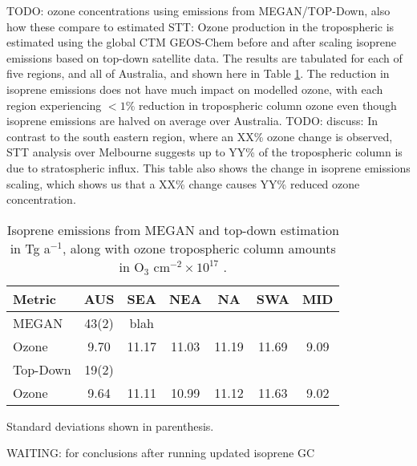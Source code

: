   TODO: ozone concentrations using emissions from MEGAN/TOP-Down, also how these compare to estimated STT:
  Ozone production in the tropospheric is estimated using the global CTM GEOS-Chem before and after scaling isoprene emissions based on top-down satellite data. 
  The results are tabulated for each of five regions, and all of Australia, and shown here in Table \ref{Conclusions:ozone:tab_emissions_vs_ozone}.
  The reduction in isoprene emissions does not have much impact on modelled ozone, with each region experiencing $< 1\%$ reduction in tropospheric column ozone even though isoprene emissions are halved on average over Australia.
  TODO: discuss: In contrast to the south eastern region, where an XX\% ozone change is observed, STT analysis over Melbourne suggests up to YY\% of the tropospheric column is due to stratospheric influx.
  This table also shows the change in isoprene emissions scaling, which shows us that a XX\% change causes YY\% reduced ozone concentration.
  

  \begin{table}\begin{threeparttable}
    \caption{Isoprene emissions from MEGAN and top-down estimation in Tg a$^{-1}$, along with ozone tropospheric column amounts in O$_3$ cm$^{-2} \times 10^{17}$ .}
    \begin{tabular}{ l c c c c c c } 
      \toprule
      Metric & AUS & SEA & NEA & NA & SWA & MID \\
      \midrule
      MEGAN & 43(2) & blah &  &  & & \\
      Ozone & 9.70 & 11.17 & 11.03 & 11.19 & 11.69 & 9.09 \\
      \midrule
      Top-Down & 19(2) & & & & & \\
      Ozone & 9.64 & 11.11 & 10.99 & 11.12 & 11.63 & 9.02 \\
      \bottomrule
    \end{tabular}
    \begin{tablenotes}
      \item Standard deviations shown in parenthesis.
    \end{tablenotes}
    \label{Conclusions:ozone:tab_emissions_vs_ozone}
  \end{threeparttable}\end{table}


  WAITING: for conclusions after running updated isoprene GC
  
